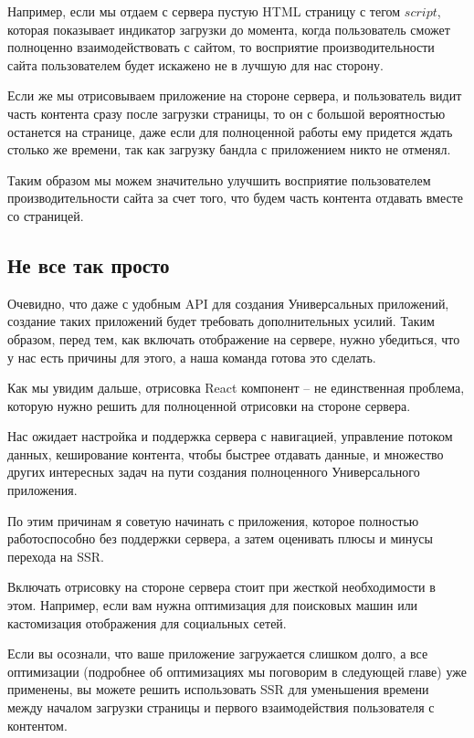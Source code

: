 Например, если мы отдаем с сервера пустую HTML страницу с тегом $script$, которая показывает индикатор загрузки до момента, когда пользователь сможет полноценно взаимодействовать с сайтом, то восприятие производительности сайта пользователем будет искажено не в лучшую для нас сторону.

Если же мы отрисовываем приложение на стороне сервера, и пользователь видит часть контента сразу после загрузки страницы, то он с большой вероятностью останется на странице, даже если для полноценной работы ему придется ждать столько же времени, так как загрузку бандла с приложением никто не отменял.

Таким образом мы можем значительно улучшить восприятие пользователем производительности сайта за счет того, что будем часть контента отдавать вместе со страницей.

\subsection{Не все так просто}

Очевидно, что даже с удобным API для создания Универсальных приложений, создание таких приложений будет требовать дополнительных усилий. Таким образом, перед тем, как включать отображение на сервере, нужно убедиться, что у нас есть причины для этого, а наша команда готова это сделать.

Как мы увидим дальше, отрисовка React компонент -- не единственная проблема, которую нужно решить для полноценной отрисовки на стороне сервера.

Нас ожидает настройка и поддержка сервера с навигацией, управление потоком данных, кеширование контента, чтобы быстрее отдавать данные, и множество других интересных задач на пути создания полноценного Универсального приложения.

По этим причинам я советую начинать с приложения, которое полностью работоспособно без поддержки сервера, а затем оценивать плюсы и минусы перехода на SSR.

Включать отрисовку на стороне сервера стоит при жесткой необходимости в этом. Например, если вам нужна оптимизация для поисковых машин или кастомизация отображения для социальных сетей.

Если вы осознали, что ваше приложение загружается слишком долго, а все оптимизации (подробнее об оптимизациях мы поговорим в следующей главе) уже применены, вы можете решить использовать SSR для уменьшения времени между началом загрузки страницы и первого взаимодействия пользователя с контентом. 

